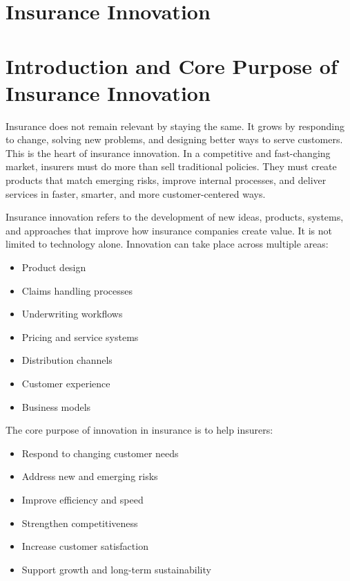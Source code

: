 \documentclass[12pt,a4paper]{article}
\begin{document}
\section*{Insurance Innovation}

\section{Introduction and Core Purpose of Insurance Innovation}

Insurance does not remain relevant by staying the same. It grows by responding to change, solving new problems, and designing better ways to serve customers. This is the heart of insurance innovation. In a competitive and fast-changing market, insurers must do more than sell traditional policies. They must create products that match emerging risks, improve internal processes, and deliver services in faster, smarter, and more customer-centered ways.

Insurance innovation refers to the development of new ideas, products, systems, and approaches that improve how insurance companies create value. It is not limited to technology alone. Innovation can take place across multiple areas:
\begin{itemize}
    \item Product design
    \item Claims handling processes
    \item Underwriting workflows
    \item Pricing and service systems
    \item Distribution channels
    \item Customer experience
    \item Business models
\end{itemize}

The core purpose of innovation in insurance is to help insurers:
\begin{itemize}
    \item Respond to changing customer needs
    \item Address new and emerging risks
    \item Improve efficiency and speed
    \item Strengthen competitiveness
    \item Increase customer satisfaction
    \item Support growth and long-term sustainability
\end{itemize}
\end{document}

